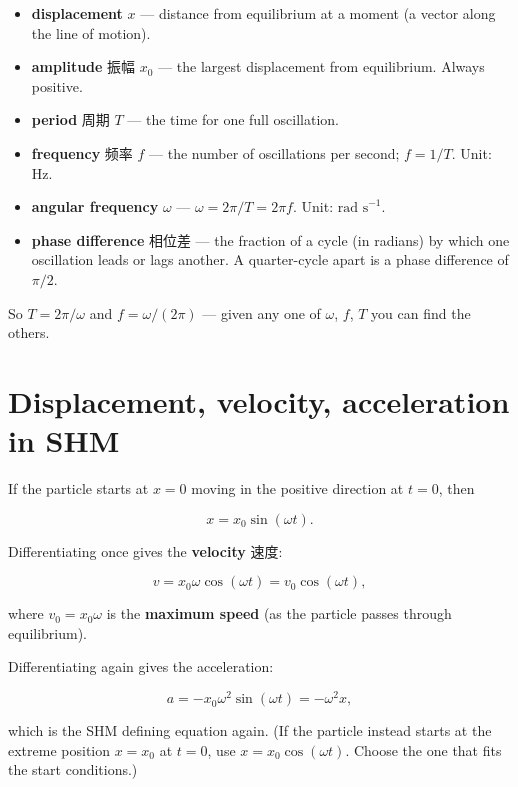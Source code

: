 \documentclass[11pt]{article}
\begin{document}
\begin{itemize}
\item \textbf{displacement} $x$ — distance from equilibrium at a moment (a vector along the line of motion).

\item \textbf{amplitude} 振幅 $x_{0}$ — the largest displacement from equilibrium. Always positive.

\item \textbf{period} 周期 $T$ — the time for one full oscillation.

\item \textbf{frequency} 频率 $f$ — the number of oscillations per second; $f = 1/T$. Unit: Hz.

\item \textbf{angular frequency} $\omega$ — $\omega = 2\pi/T = 2\pi f$. Unit: $\text{rad s}^{-1}$.

\item \textbf{phase difference} 相位差 — the fraction of a cycle (in radians) by which one oscillation leads or lags another. A quarter-cycle apart is a phase difference of $\pi/2$.

\end{itemize}

So $T = 2\pi/\omega$ and $f = \omega/(2\pi)$ — given any one of $\omega$, $f$, $T$ you can find the others.

\section*{Displacement, velocity, acceleration in SHM}

If the particle starts at $x = 0$ moving in the positive direction at $t = 0$, then

\[
x = x_{0} \sin (\omega t).
\]

Differentiating once gives the \textbf{velocity} 速度:

\[
v = x_{0} \omega \cos(\omega t) = v_{0} \cos(\omega t),
\]

where $v_{0} = x_{0} \omega$ is the \textbf{maximum speed} (as the particle passes through equilibrium).

Differentiating again gives the acceleration:

\[
a = -x_{0} \omega^{2} \sin(\omega t) = -\omega^{2} x,
\]

which is the SHM defining equation again. (If the particle instead starts at the extreme position $x = x_{0}$ at $t = 0$, use $x = x_{0} \cos(\omega t)$. Choose the one that fits the start conditions.)
\end{document}
